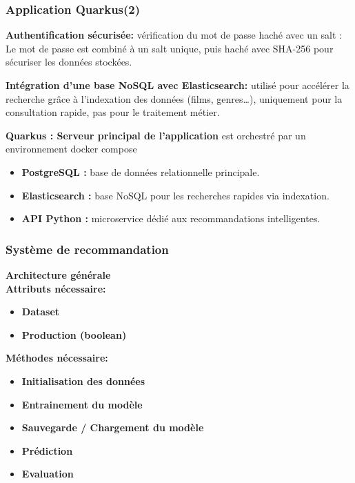 \documentclass{beamer}
\begin{document}
\begin{frame}
    \scriptsize
    \frametitle{Application Quarkus(2)}
    \textbf{Authentification sécurisée: }vérification du mot de passe haché avec un salt : Le mot de passe est combiné à un salt unique, puis haché avec SHA-256 pour sécuriser les données stockées.

    \textbf{Intégration d’une base NoSQL avec Elasticsearch: } utilisé pour accélérer la recherche grâce à l’indexation des données (films, genres…), uniquement pour la consultation rapide, pas pour le traitement métier.

    \textbf{Quarkus : Serveur principal de l’application} est orchestré par un environnement docker compose
    \begin{itemize}
        \item \textbf{PostgreSQL :} base de données relationnelle principale.
        \item \textbf{Elasticsearch :} base NoSQL pour les recherches rapides via indexation.
        \item \textbf{API Python :} microservice dédié aux recommandations intelligentes.


    \end{itemize}



\end{frame}

\begin{frame}
    \scriptsize
    \frametitle{Système de recommandation}
    \vspace{0.3cm}
    {\large\textbf{Architecture générale}\\}
    \vspace{0.3cm}
    \textbf{Attributs nécessaire:}
    \begin{itemize}
        \item \textbf{Dataset}
        \item \textbf{Production (boolean)}
    \end{itemize}
    \vspace{0.3cm}
    \textbf{Méthodes nécessaire:}
    \begin{itemize}
        \item \textbf{Initialisation des données}
        \item \textbf{Entrainement du modèle}
        \item \textbf{Sauvegarde / Chargement du modèle}
        \item \textbf{Prédiction}
        \item \textbf{Evaluation}
    \end{itemize}
\end{frame}
\end{document}
